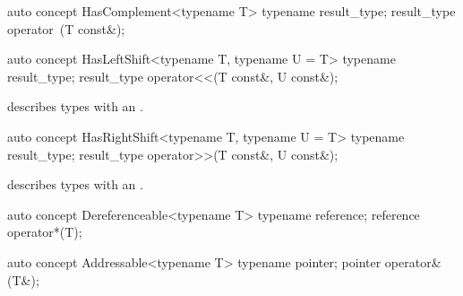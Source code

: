 \documentclass[american,twoside]{book}
\begin{document}
\begin{itemdescr}
\pnum
{}
\end{itemdescr}

\begin{itemdecl}
auto concept HasComplement<typename T> {
  typename result_type;
  result_type operator~(T const&);
}
\end{itemdecl}

\begin{itemdescr}
\pnum
{}
\end{itemdescr}

\begin{itemdecl}
auto concept HasLeftShift<typename T, typename U = T> {
  typename result_type;
  result_type operator<<(T const&, U const&);
}
\end{itemdecl}

\begin{itemdescr}
\pnum
\mbox{\reallynote} describes types with an \mbox{}.
\end{itemdescr}

\begin{itemdecl}
auto concept HasRightShift<typename T, typename U = T> {
  typename result_type;
  result_type operator>>(T const&, U const&);
}
\end{itemdecl}

\begin{itemdescr}
\pnum
\mbox{\reallynote} describes types with an \mbox{}.
\end{itemdescr}

\begin{itemdecl}
auto concept Dereferenceable<typename T> {
  typename reference;
  reference operator*(T);
}
\end{itemdecl}

\begin{itemdescr}
\pnum
{}
\end{itemdescr}

\begin{itemdecl}
auto concept Addressable<typename T> {
  typename pointer;
  pointer operator&(T&);
}
\end{itemdecl}

\begin{itemdescr}
\pnum
{}
\end{itemdescr}
\end{document}
